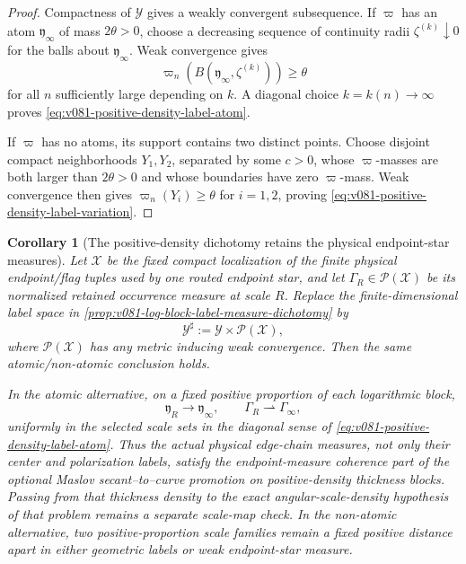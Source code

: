 \documentclass[10pt]{article}
\newtheorem{corollary}[theorem]{Corollary}
\begin{document}
\begin{proof}
Compactness of \(\mathcal Y\) gives a weakly convergent subsequence.  If \(\varpi\) has an atom
\(\mathfrak y_\infty\) of mass \(2\theta>0\), choose a decreasing sequence of continuity radii
\(\zeta^{(k)}\downarrow0\) for the balls about \(\mathfrak y_\infty\).  Weak convergence gives
\[
\varpi_n(B(\mathfrak y_\infty,\zeta^{(k)}))\ge\theta
\]
for all \(n\) sufficiently large depending on \(k\).  A diagonal choice
\(k=k(n)\to\infty\) proves \eqref{eq:v081-positive-density-label-atom}.

If \(\varpi\) has no atoms, its support contains two distinct points.  Choose disjoint compact
neighborhoods \(Y_1,Y_2\), separated by some \(c>0\), whose \(\varpi\)-masses are both larger than
\(2\theta>0\) and whose boundaries have zero \(\varpi\)-mass.  Weak convergence then gives
\(\varpi_n(Y_i)\ge\theta\) for \(i=1,2\), proving
\eqref{eq:v081-positive-density-label-variation}.
\end{proof}

\begin{corollary}[The positive-density dichotomy retains the physical endpoint-star measures]
\label{cor:v081-endpoint-measure-label-dichotomy}
Let \(\mathcal X\) be the fixed compact localization of the finite physical endpoint/flag tuples
used by one routed endpoint star, and let
\(\Gamma_R\in\mathcal P(\mathcal X)\) be its normalized retained occurrence measure at scale
\(R\).  Replace the finite-dimensional label space in
\cref{prop:v081-log-block-label-measure-dichotomy} by
\[
\mathcal Y^\sharp
:=
\mathcal Y\times\mathcal P(\mathcal X),
\]
where \(\mathcal P(\mathcal X)\) has any metric inducing weak convergence.  Then the same
atomic/non-atomic conclusion holds.

In the atomic alternative, on a fixed positive proportion of each logarithmic block,
\begin{equation}
\label{eq:v081-positive-density-endpoint-measure-coherence}
\boxed{
\mathfrak y_R\longrightarrow\mathfrak y_\infty,
\qquad
\Gamma_R\rightharpoonup\Gamma_\infty,
}
\end{equation}
uniformly in the selected scale sets in the diagonal sense of
\eqref{eq:v081-positive-density-label-atom}.  Thus the actual physical edge-chain measures, not
only their center and polarization labels, satisfy the endpoint-measure coherence part of
the optional Maslov secant--to--curve promotion on positive-density \emph{thickness} blocks.  Passing from that
thickness density to the exact angular-scale-density hypothesis of that problem remains a separate
scale-map check.  In the non-atomic alternative, two positive-proportion scale families remain a
fixed positive distance apart in either geometric labels or weak endpoint-star measure.
\end{corollary}
\end{document}
